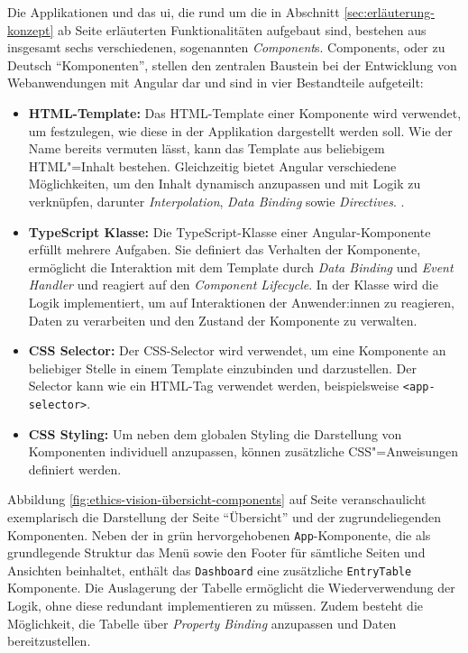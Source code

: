 \documentclass[a4paper,12pt,twoside,numbers=noendperiod]{scrreprt}
\begin{document}
Die Applikationen und das \acl{ui}, die rund um die in Abschnitt \ref{sec:erläuterung-konzept} ab Seite \pageref{sec:erläuterung-konzept} erläuterten Funktionalitäten aufgebaut sind, bestehen aus insgesamt sechs verschiedenen, sogenannten \textit{Component}s. Components, oder zu Deutsch \enquote{Komponenten}, stellen den zentralen Baustein bei der Entwicklung von Webanwendungen mit Angular dar und sind in vier Bestandteile aufgeteilt:
\begin{itemize}
    \item \textbf{HTML-Template:} Das HTML-Template einer Komponente wird verwendet, um festzulegen, wie diese in der Applikation dargestellt werden soll. Wie der Name bereits vermuten lässt, kann das Template aus beliebigem HTML"=Inhalt bestehen. Gleichzeitig bietet Angular verschiedene Möglichkeiten, um den Inhalt dynamisch anzupassen und mit Logik zu verknüpfen, darunter \textit{Interpolation}, \textit{Data Binding} sowie \textit{Directives}. \cite{google_llc_2023_angular-components, google_llc_2023_angular-template}.
    \item \textbf{TypeScript Klasse:} Die TypeScript-Klasse einer Angular-Komponente erfüllt mehrere Aufgaben. Sie definiert das Verhalten der Komponente, ermöglicht die Interaktion mit dem Template durch \textit{Data Binding} und \textit{Event Handler} und reagiert auf den \textit{Component Lifecycle}. In der Klasse wird die Logik implementiert, um auf Interaktionen der Anwender:innen zu reagieren, Daten zu verarbeiten und den Zustand der Komponente zu verwalten. \cite{google_llc_2023_angular-components, google_llc_2023-component-lifecycle}
    \item \textbf{CSS Selector:} Der CSS-Selector wird verwendet, um eine Komponente an beliebiger Stelle in einem Template einzubinden und darzustellen. Der Selector kann wie ein HTML-Tag verwendet werden, beispielsweise \texttt{<app-selector>}. \cite{google_llc_2023_angular-components}
    \item \textbf{CSS Styling:} Um neben dem globalen Styling die Darstellung von Komponenten individuell anzupassen, können zusätzliche CSS"=Anweisungen definiert werden. \cite{google_llc_2023_angular-components}
\end{itemize}

Abbildung \ref{fig:ethics-vision-übersicht-components} auf Seite \pageref{fig:ethics-vision-übersicht-components} veranschaulicht exemplarisch die Darstellung der Seite \enquote{Übersicht} und der zugrundeliegenden Komponenten. Neben der in grün hervorgehobenen \texttt{App}-Komponente, die als grundlegende Struktur das Menü sowie den Footer für sämtliche Seiten und Ansichten beinhaltet, enthält das \texttt{Dashboard} eine zusätzliche \texttt{EntryTable} Komponente. Die Auslagerung der Tabelle ermöglicht die Wiederverwendung der Logik, ohne diese redundant implementieren zu müssen. Zudem besteht die Möglichkeit, die Tabelle über \textit{Property Binding} anzupassen und Daten bereitzustellen.
\end{document}
